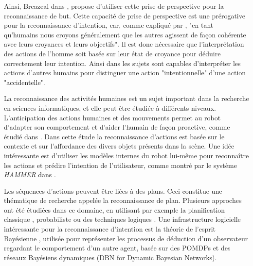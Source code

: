 \documentclass[a4paper,11pt,twoside]{StyleThese}
\begin{document}
Ainsi, Breazeal dans \cite{BreazealGB09}, propose d'utiliser cette prise de perspective pour la reconnaissance de but. Cette capacité de prise de perspective est une prérogative pour la reconnaissance d'intention, car, comme expliqué par \cite{byom2013theory}, "en tant qu'humains nous croyons généralement que les autres agissent de façon cohérente avec leurs croyances et leurs objectifs". Il est donc nécessaire que l'interprétation des actions de l'homme soit basée sur leur état de croyance pour déduire correctement leur intention. Ainsi dans \cite{Call1998} les sujets sont capables d'interpréter les actions d'autres humains pour distinguer une action "intentionnelle" d'une action "accidentelle".

La reconnaissance des activités humaines est un sujet important dans la recherche en sciences informatiques, et elle peut être étudiée à différents niveaux. L'anticipation des actions humaines et des mouvements permet au robot d'adapter son comportement et d'aider l'humain de façon proactive, comme étudié dans \cite{koppula2013anticipating}. Dans cette étude la reconnaissance d'actions est basée sur le contexte et sur l'affordance des divers objets présents dans la scène.
Une idée intéressante est d'utiliser les modèles internes du robot lui-même pour reconnaître les actions et prédire l'intention de l'utilisateur, comme montré par le système \textit{HAMMER} dans \cite{demiris2007prediction}. 

Les séquences d'actions peuvent être liées à des plans. Ceci constitue une thématique de recherche appelée la reconnaissance de plan. Plusieurs approches ont été étudiées dans ce domaine, en utilisant par exemple la planification classique \cite{ramirez2009plan}, probabiliste \cite{bui2003general} ou des techniques logiques \cite{singla2011abductive}. Une infrastructure logicielle intéressante pour la reconnaissance d'intention est la théorie de l'esprit Bayésienne \cite{baker2014modeling}, utilisée pour représenter les processus de déduction d'un observateur regardant le comportement d'un autre agent, basée sur des POMDPs et des réseaux Bayésiens dynamiques (DBN for Dynamic Bayesian Networks).
\end{document}
